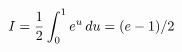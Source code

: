 \documentclass[preview]{standalone}
\begin{document}
\begin{align*}
\special{dvisvgm:raw <g id='unique000'>}I=\frac12\int_0^1e^u\,du=(e-1)/2\special{dvisvgm:raw </g>}
\end{align*}
\end{document}
